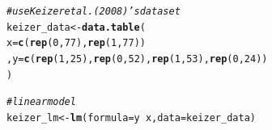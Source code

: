 \documentclass[11pt]{article}\usepackage[]{graphicx}\usepackage[]{color}
\makeatletter
\newcommand{\hlnum}[1]{\textcolor[rgb]{0.686,0.059,0.569}{#1}}%
\newcommand{\hlcom}[1]{\textcolor[rgb]{0.678,0.584,0.686}{\textit{#1}}}%
\newcommand{\hlopt}[1]{\textcolor[rgb]{0,0,0}{#1}}%
\newcommand{\hlstd}[1]{\textcolor[rgb]{0.345,0.345,0.345}{#1}}%
\newcommand{\hlkwb}[1]{\textcolor[rgb]{0.69,0.353,0.396}{#1}}%
\newcommand{\hlkwc}[1]{\textcolor[rgb]{0.333,0.667,0.333}{#1}}%
\newcommand{\hlkwd}[1]{\textcolor[rgb]{0.737,0.353,0.396}{\textbf{#1}}}%
\newenvironment{kframe}{%
 \def\at@end@of@kframe{}%
 \ifinner\ifhmode%
  \def\at@end@of@kframe{\end{minipage}}%
  \begin{minipage}{\columnwidth}%
 \fi\fi%
 \def\FrameCommand##1{\hskip\@totalleftmargin \hskip-\fboxsep
 \colorbox{shadecolor}{##1}\hskip-\fboxsep
     \hskip-\linewidth \hskip-\@totalleftmargin \hskip\columnwidth}%
 \MakeFramed {\advance\hsize-\width
   \@totalleftmargin\z@ \linewidth\hsize
   \@setminipage}}%
 {\par\unskip\endMakeFramed%
 \at@end@of@kframe}
\newenvironment{knitrout}{}{} %
\makeatother
\begin{document}
\begin{knitrout}
\color{fgcolor}\begin{kframe}
\begin{alltt}
\hlcom{# use Keizer et al. (2008)'s dataset}
\hlstd{keizer_data} \hlkwb{<-} \hlkwd{data.table}\hlstd{(}
          \hlkwc{x} \hlstd{=} \hlkwd{c}\hlstd{(}\hlkwd{rep}\hlstd{(}\hlnum{0}\hlstd{,}\hlnum{77}\hlstd{),} \hlkwd{rep}\hlstd{(}\hlnum{1}\hlstd{,}\hlnum{77}\hlstd{))}
        \hlstd{,} \hlkwc{y} \hlstd{=} \hlkwd{c}\hlstd{(}\hlkwd{rep}\hlstd{(}\hlnum{1}\hlstd{,}\hlnum{25}\hlstd{),} \hlkwd{rep}\hlstd{(}\hlnum{0}\hlstd{,}\hlnum{52}\hlstd{),} \hlkwd{rep}\hlstd{(}\hlnum{1}\hlstd{,}\hlnum{53}\hlstd{),} \hlkwd{rep}\hlstd{(}\hlnum{0}\hlstd{,}\hlnum{24}\hlstd{))}
        \hlstd{)}

\hlcom{# linear model}
\hlstd{keizer_lm} \hlkwb{<-} \hlkwd{lm}\hlstd{(}\hlkwc{formula} \hlstd{= y}\hlopt{~}\hlstd{x,} \hlkwc{data} \hlstd{= keizer_data)}


\end{alltt}
\end{kframe}
\end{knitrout}
\end{document}

